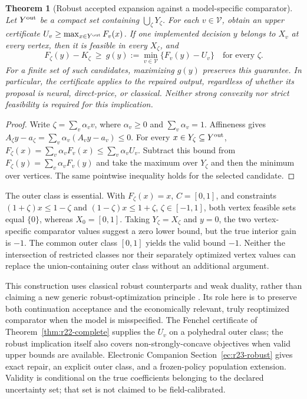 \documentclass[11pt,letterpaper]{article}
\newtheorem{theorem}{Theorem}[section]
\theoremstyle{definition}
\newcommand{\1}{\mathbf 1}
\begin{document}
\begin{theorem}[Robust accepted expansion against a model-specific comparator]\label{thm:r23-robust}
Let $Y^{\rm out}$ be a compact set containing $\bigcup_\zeta Y_\zeta$. For each $v\in\mathcal V$, obtain an upper certificate $U_v\geq\max_{x\in Y^{\rm out}}F_v(x)$. If one implemented decision $y$ belongs to $X_v$ at every vertex, then it is feasible in every $X_\zeta$, and
\begin{equation}\label{eq:r23-gain}
 F_\zeta(y)-K_\zeta\ \geq\ g(y):=\min_{v\in\mathcal V}\{F_v(y)-U_v\}
 \quad\text{for every }\zeta.
\end{equation}
For a finite set of such candidates, maximizing $g(y)$ preserves this guarantee. In particular, the certificate applies to the repaired output, regardless of whether its proposal is neural, direct-price, or classical. Neither strong convexity nor strict feasibility is required for this implication.
\end{theorem}
\begin{proof}
Write $\zeta=\sum_v\alpha_v v$, where $\alpha_v\geq0$ and $\sum_v\alpha_v=1$. Affineness gives $A_\zeta y-a_\zeta=\sum_v\alpha_v(A_vy-a_v)\leq0$. For every $x\in Y_\zeta\subseteq Y^{\rm out}$,
$F_\zeta(x)=\sum_v\alpha_vF_v(x)\leq\sum_v\alpha_vU_v$.
Subtract this bound from $F_\zeta(y)=\sum_v\alpha_vF_v(y)$ and take the maximum over $Y_\zeta$ and then the minimum over vertices. The same pointwise inequality holds for the selected candidate.
\end{proof}

The outer class is essential. With $F_\zeta(x)=x$, $C=[0,1]$, and constraints $(1+\zeta)x\leq1-\zeta$ and $(1-\zeta)x\leq1+\zeta$, $\zeta\in[-1,1]$, both vertex feasible sets equal $\{0\}$, whereas $X_0=[0,1]$. Taking $Y_\zeta=X_\zeta$ and $y=0$, the two vertex-specific comparator values suggest a zero lower bound, but the true interior gain is $-1$. The common outer class $[0,1]$ yields the valid bound $-1$. Neither the intersection of restricted classes nor their separately optimized vertex values can replace the union-containing outer class without an additional argument.

This construction uses classical robust counterparts and weak duality, rather than claiming a new generic robust-optimization principle \citep{BenTalNemirovski2000,BertsimasSim2004}. Its role here is to preserve both continuation acceptance and the economically relevant, truly reoptimized comparator when the model is misspecified. The Fenchel certificate of Theorem~\ref{thm:r22-complete} supplies the $U_v$ on a polyhedral outer class; the robust implication itself also covers non-strongly-concave objectives when valid upper bounds are available. Electronic Companion Section~\ref{ec:r23-robust} gives exact repair, an explicit outer class, and a frozen-policy population extension. Validity is conditional on the true coefficients belonging to the declared uncertainty set; that set is not claimed to be field-calibrated.
\end{document}
